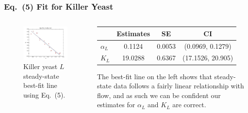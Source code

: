 \documentclass{beamer}
\begin{document}
\begin{frame}
  \frametitle{Eq.\ (5) Fit for Killer Yeast}
  \begin{columns}
  \begin{column}{0.4\textwidth}
  \begin{figure}[H]
    \centering
      \includegraphics[width=1.0\textwidth]{../doc/images/killerFit.jpg}
    \caption{\footnotesize Killer yeast $L$ steady-state best-fit line using Eq.\ (5).}
  \end{figure}
  \end{column}
  \begin{column}{0.6\textwidth}
  \footnotesize
  \begin{center}
  \begin{tabular}{l | c c c}
    & Estimates & SE & CI \\ 
    \hline
    $\alpha_L$ & 0.1124  & 0.0053 & (0.0969,  0.1279) \\
    $K_L$      & 19.0288 & 0.6367 & (17.1526, 20.905) \\
  \end{tabular}
  \end{center}
  \normalsize
  The best-fit line on the left shows that steady-state data follows a fairly linear relationship with flow, and as such we can be confident our estimates for $\alpha_L$ and $K_L$ are correct.
  \end{column}
  \end{columns}
\end{frame}
\end{document}
